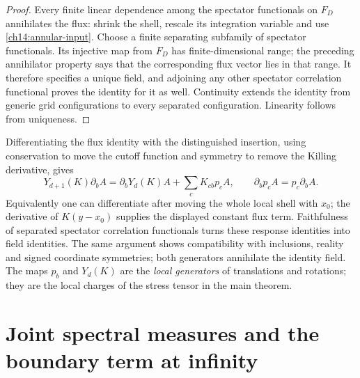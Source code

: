 \begin{proof}
Every finite linear dependence among the spectator functionals on
$F_D$ annihilates the flux: shrink the shell, rescale its
integration variable and use \eqref{ch14:annular-input}. Choose a
finite separating subfamily of spectator functionals. Its injective
map from $F_D$ has finite-dimensional range; the preceding
annihilator property says that the corresponding flux vector lies
in that range. It therefore specifies a unique field, and adjoining
any other spectator correlation functional proves the identity for it as well.
Continuity extends the identity from generic grid configurations to
every separated configuration. Linearity follows from uniqueness.
\end{proof}

Differentiating the flux identity with the distinguished insertion,
using conservation to move the cutoff function and symmetry to remove the
Killing derivative, gives
\begin{equation}\label{ch14:charge-commute}
 Y_{d+1}(K)\partial_bA
   =\partial_bY_d(K)A+\sum_cK_{cb}p_cA,
 \qquad \partial_bp_cA=p_c\partial_bA.
\end{equation}
Equivalently one can differentiate after moving the whole local
shell with $x_0$; the derivative of $K(y-x_0)$ supplies the displayed
constant flux term. Faithfulness of separated spectator correlation functionals turns
these response identities into field identities. The same argument
shows compatibility with inclusions, reality and signed coordinate
symmetries; both generators annihilate the identity field. The maps $p_b$ and $Y_d(K)$ are the \emph{local generators} of translations and rotations; they are the local charges of the stress tensor in the main theorem.

\section{Joint spectral measures and the boundary term at infinity}
\label{ch14:spectral}

